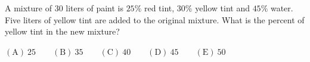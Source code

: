 A mixture of $30$ liters of paint is $25\%$ red tint, $30\%$ yellow tint and $45\%$ water. Five liters of yellow tint are added to the original mixture. What is the percent of yellow tint in the new mixture?

$\mathrm{(A)}\ 25 \qquad \mathrm{(B)}\ 35 \qquad \mathrm{(C)}\ 40 \qquad \mathrm{(D)}\ 45 \qquad \mathrm{(E)}\ 50$
